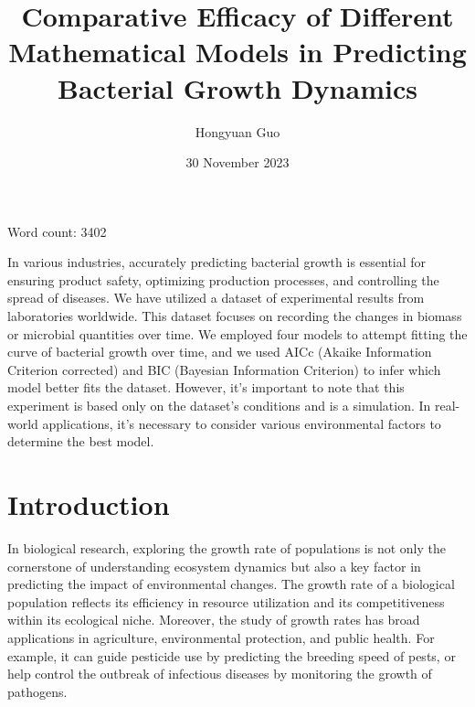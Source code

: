 \documentclass[11pt]{article}
\title{Comparative Efficacy of Different Mathematical Models in Predicting Bacterial Growth Dynamics}
\author{Hongyuan Guo}
\affil{Imperial College London}
\date{30 November 2023}
\renewenvironment{abstract}
  {\section*{\abstractname}} 
  {}
\renewenvironment{abstract}
 {\begin{center}\bfseries\abstractname\end{center}}
 {}
\begin{document}
    \begin{titlepage}
    \maketitle
    \thispagestyle{empty}
    
    \begin{center}
        Word count: 3402
    \end{center}
    
    \end{titlepage}

    \begin{linenumbers}
    
    \begin{abstract}

In various industries, accurately predicting bacterial growth is essential for ensuring product safety, optimizing production processes, and controlling the spread of diseases. We have utilized a dataset of experimental results from laboratories worldwide. This dataset focuses on recording the changes in biomass or microbial quantities over time. We employed four models to attempt fitting the curve of bacterial growth over time, and we used AICc (Akaike Information Criterion corrected) and BIC (Bayesian Information Criterion) to infer which model better fits the dataset. However, it's important to note that this experiment is based only on the dataset's conditions and is a simulation. In real-world applications, it's necessary to consider various environmental factors to determine the best model.

    \end{abstract}


    \section{Introduction}
In biological research, exploring the growth rate of populations is not only the cornerstone of understanding ecosystem dynamics but also a key factor in predicting the impact of environmental changes. The growth rate of a biological population reflects its efficiency in resource utilization and its competitiveness within its ecological niche\citep{sibly2002population}. Moreover, the study of growth rates has broad applications in agriculture, environmental protection, and public health\citep{calka2022ratio}. For example, it can guide pesticide use by predicting the breeding speed of pests, or help control the outbreak of infectious diseases by monitoring the growth of pathogens\citep{semenza2022climate}\citep{fisman2022impact}.


\end{linenumbers}
\end{document}
